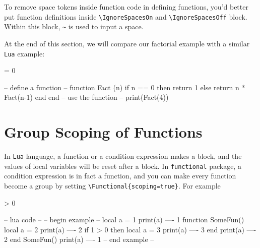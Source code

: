\documentclass[oneside]{book}
\begin{document}
To remove space tokens inside function code in defining functions,
you'd better put function definitions inside \verb!\IgnoreSpacesOn! and
\verb!\IgnoreSpacesOff! block. Within this block, \verb!~! is used to input a space.

At the end of this section,
we will compare our factorial example with a similar \verb!Lua! example:

\begin{minipage}{0.68\textwidth}
\begin{codehigh}
\IgnoreSpacesOn
\prgNewFunction {} {
   = {0} {
  }{
  }
}
\IgnoreSpacesOff
{}
\end{codehigh}
\end{minipage}%
\begin{minipage}{0.32\textwidth}
\begin{code}
-- define a function --
function Fact (n)
  if n == 0 then
    return 1
  else
    return n * Fact(n-1)
  end
end
-- use the function --
print(Fact(4))
\end{code}
\end{minipage}


\section{Group Scoping of Functions}

In \verb!Lua! language, a function or a condition expression makes a block,
and the values of local variables will be reset after a block.
In \verb!functional! package, a condition expression is in fact a function,
and you can make every function become a group by setting
\verb!\Functional{scoping=true}!. For example

\begin{minipage}{0.58\textwidth}
\begin{codehigh}
\IgnoreSpacesOn
\intSet {}
\intVarLog \lTmpaInt            %
\prgNewFunction \someFun { } {
  \intSet {}
  \intVarLog \lTmpaInt          %
   > {0} {
    \intSet {}
    \intVarLog \lTmpaInt        %
  }{ }
  \intVarLog \lTmpaInt          %
}
\someFun
\intVarLog \lTmpaInt            %
\IgnoreSpacesOff
\end{codehigh}
\end{minipage}%
\begin{minipage}{0.42\textwidth}
\begin{code}
-- lua code --
-- begin example --
local a = 1
print(a)            ---- 1
function SomeFun()
  local a = 2
  print(a)          ---- 2
  if 1 > 0 then
    local a = 3
    print(a)        ---- 3
  end
  print(a)          ---- 2
end
SomeFun()
print(a)            ---- 1
-- end example --
\end{code}
\end{minipage}
\end{document}
